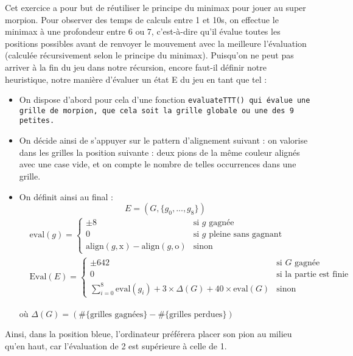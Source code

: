 \documentclass[14pt,a4paper]{article}
\begin{document}
Cet exercice a pour but de réutiliser le principe du minimax pour jouer au super morpion. Pour observer des temps de calculs entre 1 et 10s, on effectue le minimax à une profondeur entre 6 ou 7, c'est-à-dire qu'il évalue toutes les positions possibles avant de renvoyer le mouvement avec la meilleure l'évaluation (calculée récursivement selon le principe du minimax). Puisqu'on ne peut pas arriver à la fin du jeu dans notre récursion, encore faut-il définir notre heuristique, notre manière d'évaluer un état E du jeu en tant que tel :
\begin{itemize}[label=-]
    
    \item On dispose d'abord pour cela d'une fonction \tt{evaluateTTT()} qui évalue une grille de morpion, que cela soit la grille globale ou une des 9 petites.
    
    \item On décide ainsi de s'appuyer sur le pattern d'alignement suivant : on valorise dans les grilles la position suivante : deux pions de la même couleur alignés avec une case vide, et on compte le nombre de telles occurrences dans une grille.
    
    \item On définit ainsi au final : 
    $$
    E = (G, \{g_0, ..., g_8\})
    $$
\begin{align*}
    &\text{eval}(g) =
    \begin{cases} \pm 8 & \text{si } g \text{ gagnée}\\
        0 & \text{si } g \text{ pleine sans gagnant}\\
        \text{align}(g, \text{x}) - \text{align}(g, \text{o}) & \text{sinon}
    \end{cases}\\
    &\text{Eval}(E) = 
    \begin{cases}
        \pm 642 & \text{si } G \text{ gagnée}\\
        0 & \text{si la partie est finie}\\
        \sum_{i=0}^8  \text{eval}(g_i) + 3 \times \Delta(G) + 40 \times \text{eval}(G) & \text{sinon}
    \end{cases} 
\end{align*}
    
    
    où $\Delta(G) = (\#\{\text{grilles gagnées}\} - \#\{\text{grilles perdues}\})$
    
    
\end{itemize}

Ainsi, dans la position bleue, l'ordinateur préférera placer son pion au milieu qu'en haut, car l'évaluation de 2 est supérieure à celle de 1.\\
\end{document}
